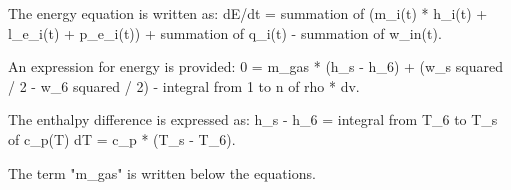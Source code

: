 The energy equation is written as:  
dE/dt = summation of (m_i(t) * h_i(t) + l_e_i(t) + p_e_i(t)) + summation of q_i(t) - summation of w_in(t).  

An expression for energy is provided:  
0 = m_gas * (h_s - h_6) + (w_s squared / 2 - w_6 squared / 2) - integral from 1 to n of rho * dv.  

The enthalpy difference is expressed as:  
h_s - h_6 = integral from T_6 to T_s of c_p(T) dT = c_p * (T_s - T_6).  

The term "m_gas" is written below the equations.